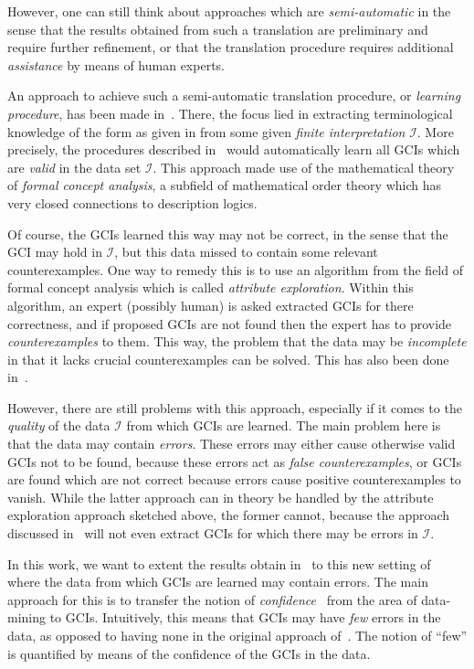 However, one can still think about approaches which are \emph{semi-automatic} in the sense
that the results obtained from such a translation are preliminary and require further
refinement, or that the translation procedure requires additional \emph{assistance} by
means of human experts.

An approach to achieve such a semi-automatic translation procedure, or \emph{learning
  procedure}, has been made in~\cite{Diss-Felix}.  There, the focus lied in extracting
terminological knowledge of the form as given in  from some given \emph{finite
  interpretation} $\mathcal{I}$.  More precisely, the procedures described
in~\cite{Diss-Felix} would automatically learn all GCIs which are \emph{valid} in the data
set $\mathcal{I}$.  This approach made use of the mathematical theory of \emph{formal
  concept analysis}, a subfield of mathematical order theory which has very closed
connections to description logics.

Of course, the GCIs learned this way may not be correct, in the sense that the GCI may
hold in $\mathcal{I}$, but this data missed to contain some relevant counterexamples.  One
way to remedy this is to use an algorithm from the field of formal concept analysis which
is called \emph{attribute exploration}.  Within this algorithm, an expert (possibly human)
is asked extracted GCIs for there correctness, and if proposed GCIs are not found then the
expert has to provide \emph{counterexamples} to them.  This way, the problem that the data
may be \emph{incomplete} in that it lacks crucial counterexamples can be solved.  This has
also been done in~\cite{Diss-Felix}.

However, there are still problems with this approach, especially if it comes to the
\emph{quality} of the data $\mathcal{I}$ from which GCIs are learned.  The main problem
here is that the data may contain \emph{errors}.  These errors may either cause otherwise
valid GCIs not to be found, because these errors act as \emph{false counterexamples}, or
GCIs are found which are not correct because errors cause positive counterexamples to
vanish.  While the latter approach can in theory be handled by the attribute exploration
approach sketched above, the former cannot, because the approach discussed
in~\cite{Diss-Felix} will not even extract GCIs for which there may be errors in
$\mathcal{I}$.

In this work, we want to extent the results obtain in~\cite{Diss-Felix} to this new
setting of where the data from which GCIs are learned may contain errors.  The main
approach for this is to transfer the notion of
\emph{confidence}~\cite{arules:agrawal:association-rules} from the area of data-mining to
GCIs.  Intuitively, this means that GCIs may have \emph{few} errors in the data, as
opposed to having none in the original approach of~\cite{Diss-Felix}.  The notion of
``few'' is quantified by means of the confidence of the GCIs in the data.

